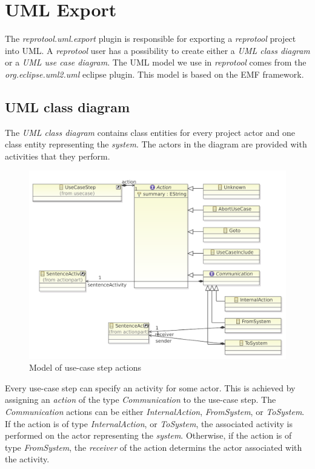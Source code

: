 \section{UML Export}

The \emph{reprotool.uml.export} plugin is responsible for exporting a \emph{reprotool} project into UML. A \emph{reprotool} user has
a possibility to create either a \emph{UML class diagram} or a \emph{UML use case diagram}. The UML model we use in \emph{reprotool}
comes from the \emph{org.eclipse.uml2.uml} eclipse plugin. This model is based on the EMF framework.

\subsection{UML class diagram}
The \emph{UML class diagram} contains class entities for every project actor and one class entity representing the \emph{system}.
The actors in the diagram are provided with activities that they perform.

\begin{figure}[ht]
  \centering
  \includegraphics[width=400pt]{images/ReprotoolActionsModelSimple}
  \caption{Model of use-case step actions}
  \label{fig:ReprotoolActionsModel}
\end{figure}

Every use-case step can specify an activity for some
actor. This is achieved by assigning an \emph{action} of the type \emph{Communication} to the use-case step. The \emph{Communication}
actions can be either \emph{InternalAction}, \emph{FromSystem}, or \emph{ToSystem}. If the action is of type \emph{InternalAction},
or \emph{ToSystem}, the associated activity is performed on the actor representing the \emph{system}. Otherwise, if the action is of
type \emph{FromSystem}, the \emph{receiver} of the action determins the actor associated with the activity.

